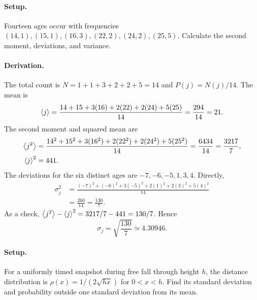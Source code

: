 \paragraph{Setup.} Fourteen ages occur with frequencies $(14,1),(15,1),(16,3),(22,2),(24,2),(25,5)$. Calculate the second moment, deviations, and variance.
\paragraph{Derivation.}
The total count is $N=1+1+3+2+2+5=14$ and $P(j)=N(j)/14$. The mean is
\begin{equation}
\left\langle j\right\rangle=\frac{14+15+3(16)+2(22)+2(24)+5(25)}{14}
=\frac{294}{14}=21.
\end{equation}
The second moment and squared mean are
\begin{align}
\left\langle j^2\right\rangle
&=\frac{14^2+15^2+3(16^2)+2(22^2)+2(24^2)+5(25^2)}{14}
=\frac{6434}{14}=\frac{3217}{7},\\
\left\langle j\right\rangle^2&=441.
\end{align}
The deviations for the six distinct ages are $-7,-6,-5,1,3,4$. Directly,
\begin{align}
\sigma_j^2&=\frac{(-7)^2+(-6)^2+3(-5)^2+2(1)^2+2(3)^2+5(4)^2}{14}\\
&=\frac{260}{14}=\frac{130}{7}.
\end{align}
As a check, $\left\langle j^2\right\rangle-\left\langle j\right\rangle^2=3217/7-441=130/7$. Hence
\begin{equation}
\boxed{\sigma_j=\sqrt{\frac{130}{7}}\simeq4.30946.}
\end{equation}

\paragraph{Setup.} For a uniformly timed snapshot during free fall through height $h$, the distance distribution is $\rho(x)=1/(2\sqrt{hx})$ for $0<x<h$. Find its standard deviation and probability outside one standard deviation from its mean.
